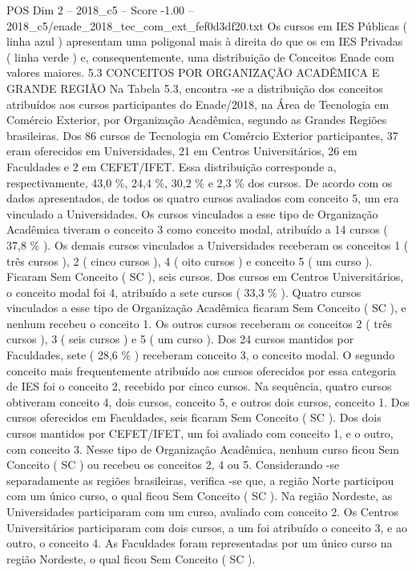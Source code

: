\begin{textsample}{POS Dim 2 – 2018\_c5 – Score -1.00 – 2018\_c5/enade\_2018\_tec\_com\_ext\_fef0d3df20.txt}
Os cursos em IES Públicas ( linha azul ) apresentam uma poligonal mais à direita do que os em IES Privadas ( linha verde ) e, consequentemente, uma distribuição de Conceitos Enade com valores maiores. 5.3 CONCEITOS POR ORGANIZAÇÃO ACADÊMICA E GRANDE REGIÃO Na Tabela 5.3, encontra -se a distribuição dos conceitos atribuídos aos cursos participantes do Enade/2018, na Área de Tecnologia em Comércio Exterior, por Organização Acadêmica, segundo as Grandes Regiões brasileiras.
Dos 86 cursos de Tecnologia em Comércio Exterior participantes, 37 eram oferecidos em Universidades, 21 em Centros Universitários, 26 em Faculdades e 2 em CEFET/IFET.
Essa distribuição corresponde a, respectivamente, 43,0 \%, 24,4 \%, 30,2 \% e 2,3 \% dos cursos.
De acordo com os dados apresentados, de todos os quatro cursos avaliados com conceito 5, um era vinculado a Universidades.
Os cursos vinculados a esse tipo de Organização Acadêmica tiveram o conceito 3 como conceito modal, atribuído a 14 cursos ( 37,8 \% ).
Os demais cursos vinculados a Universidades receberam os conceitos 1 ( três cursos ), 2 ( cinco cursos ), 4 ( oito cursos ) e conceito 5 ( um curso ).
Ficaram Sem Conceito ( SC ), seis cursos.
Dos cursos em Centros Universitários, o conceito modal foi 4, atribuído a sete cursos ( 33,3 \% ).
Quatro cursos vinculados a esse tipo de Organização Acadêmica ficaram Sem Conceito ( SC ), e nenhum recebeu o conceito 1.
Os outros cursos receberam os conceitos 2 ( três cursos ), 3 ( seis cursos ) e 5 ( um curso ).
Dos 24 cursos mantidos por Faculdades, sete ( 28,6 \% ) receberam conceito 3, o conceito modal.
O segundo conceito mais frequentemente atribuído aos cursos oferecidos por essa categoria de IES foi o conceito 2, recebido por cinco cursos.
Na sequência, quatro cursos obtiveram conceito 4, dois cursos, conceito 5, e outros dois cursos, conceito 1.
Dos cursos oferecidos em Faculdades, seis ficaram Sem Conceito ( SC ).
Dos dois cursos mantidos por CEFET/IFET, um foi avaliado com conceito 1, e o outro, com conceito 3.
Nesse tipo de Organização Acadêmica, nenhum curso ficou Sem Conceito ( SC ) ou recebeu os conceitos 2, 4 ou 5.
Considerando -se separadamente as regiões brasileiras, verifica -se que, a região Norte participou com um único curso, o qual ficou Sem Conceito ( SC ).
Na região Nordeste, as Universidades participaram com um curso, avaliado com conceito 2.
Os Centros Universitários participaram com dois cursos, a um foi atribuído o conceito 3, e ao outro, o conceito 4.
As Faculdades foram representadas por um único curso na região Nordeste, o qual ficou Sem Conceito ( SC ).

\end{textsample}
